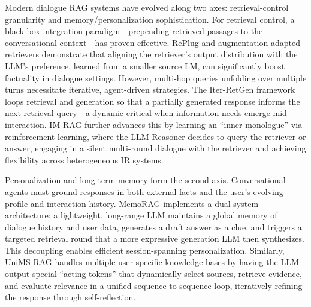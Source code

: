 \documentclass[11pt,a4paper]{article}
\begin{document}
Modern dialogue RAG systems have evolved along two axes: retrieval-control granularity and memory/personalization sophistication. For retrieval control, a black-box integration paradigm---prepending retrieved passages to the conversational context---has proven effective. RePlug and augmentation-adapted retrievers \cite{arxiv:2305.17331v1} demonstrate that aligning the retriever's output distribution with the LLM's preference, learned from a smaller source LM, can significantly boost factuality in dialogue settings. However, multi-hop queries unfolding over multiple turns necessitate iterative, agent-driven strategies. The Iter-RetGen framework \cite{arxiv:2305.15294v2} loops retrieval and generation so that a partially generated response informs the next retrieval query---a dynamic critical when information needs emerge mid-interaction. IM-RAG \cite{arxiv:2405.13021v1} further advances this by learning an ``inner monologue'' via reinforcement learning, where the LLM Reasoner decides to query the retriever or answer, engaging in a silent multi-round dialogue with the retriever and achieving flexibility across heterogeneous IR systems.

Personalization and long-term memory form the second axis. Conversational agents must ground responses in both external facts and the user's evolving profile and interaction history. MemoRAG \cite{arxiv:2409.05591v2} implements a dual-system architecture: a lightweight, long-range LLM maintains a global memory of dialogue history and user data, generates a draft answer as a clue, and triggers a targeted retrieval round that a more expressive generation LLM then synthesizes. This decoupling enables efficient session-spanning personalization. Similarly, UniMS-RAG \cite{arxiv:2401.13256v1} handles multiple user-specific knowledge bases by having the LLM output special ``acting tokens'' that dynamically select sources, retrieve evidence, and evaluate relevance in a unified sequence-to-sequence loop, iteratively refining the response through self-reflection.
\end{document}
